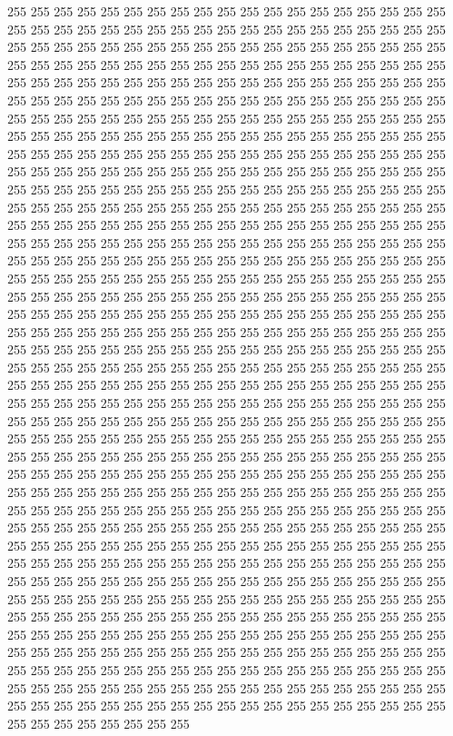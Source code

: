 255 255 255 255 255 255 255 255 255 255 255 255 255 255 255 255 255 255 255 255 255 255 255 255 255 255 255 255 255 255 255 255 255 255 255 255 255 255 255 255 255 255 255 255 255 255 255 255 255 255 255 255 255 255 255 255 255 255 255 255 255 255 255 255 255 255 255 255 255 255 255 255 255 255 255 255 255 255 255 255 255 255 255 255 255 255 255 255 255 255 255 255 255 255 255 255 255 255 255 255 255 255 255 255 255 255 255 255 255 255 255 255 255 255 255 255 255 255 255 255 255 255 255 255 255 255 255 255 
255 255 255 255 255 255 255 255 255 255 255 255 255 255 255 255 255 255 255 255 255 255 255 255 255 255 255 255 255 255 255 255 255 255 255 255 255 255 255 255 255 255 255 255 255 255 255 255 255 255 255 255 255 255 255 255 255 255 255 255 255 255 255 255 255 255 255 255 255 255 255 255 255 255 255 255 255 255 255 255 255 255 255 255 255 255 255 255 255 255 255 255 255 255 255 255 255 255 255 255 255 255 255 255 255 255 255 255 255 255 255 255 255 255 255 255 255 255 255 255 255 255 255 255 255 255 255 255 
255 255 255 255 255 255 255 255 255 255 255 255 255 255 255 255 255 255 255 255 255 255 255 255 255 255 255 255 255 255 255 255 255 255 255 255 255 255 255 255 255 255 255 255 255 255 255 255 255 255 255 255 255 255 255 255 255 255 255 255 255 255 255 255 255 255 255 255 255 255 255 255 255 255 255 255 255 255 255 255 255 255 255 255 255 255 255 255 255 255 255 255 255 255 255 255 255 255 255 255 255 255 255 255 255 255 255 255 255 255 255 255 255 255 255 255 255 255 255 255 255 255 255 255 255 255 255 255 
255 255 255 255 255 255 255 255 255 255 255 255 255 255 255 255 255 255 255 255 255 255 255 255 255 255 255 255 255 255 255 255 255 255 255 255 255 255 255 255 255 255 255 255 255 255 255 255 255 255 255 255 255 255 255 255 255 255 255 255 255 255 255 255 255 255 255 255 255 255 255 255 255 255 255 255 255 255 255 255 255 255 255 255 255 255 255 255 255 255 255 255 255 255 255 255 255 255 255 255 255 255 255 255 255 255 255 255 255 255 255 255 255 255 255 255 255 255 255 255 255 255 255 255 255 255 255 255 
255 255 255 255 255 255 255 255 255 255 255 255 255 255 255 255 255 255 255 255 255 255 255 255 255 255 255 255 255 255 255 255 255 255 255 255 255 255 255 255 255 255 255 255 255 255 255 255 255 255 255 255 255 255 255 255 255 255 255 255 255 255 255 255 255 255 255 255 255 255 255 255 255 255 255 255 255 255 255 255 255 255 255 255 255 255 255 255 255 255 255 255 255 255 255 255 255 255 255 255 255 255 255 255 255 255 255 255 255 255 255 255 255 255 255 255 255 255 255 255 255 255 255 255 255 255 255 255 
255 255 255 255 255 255 255 255 255 255 255 255 255 255 255 255 255 255 255 255 255 255 255 255 255 255 255 255 255 255 255 255 255 255 255 255 255 255 255 255 255 255 255 255 255 255 255 255 255 255 255 255 255 255 255 255 255 255 255 255 255 255 255 255 255 255 255 255 255 255 255 255 255 255 255 255 255 255 255 255 255 255 255 255 255 255 255 255 255 255 255 255 255 255 255 255 255 255 255 255 255 255 255 255 255 255 255 255 255 255 255 255 255 255 255 255 255 255 255 255 255 255 255 255 255 255 255 255